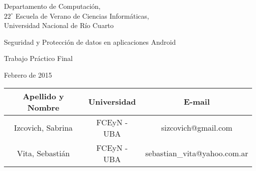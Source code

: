 \documentclass[10pt, a4paper]{article}
\author{Seguridad Android.}
\date{}								%
\begin{document}
\thispagestyle{empty}

\begin{center}

\vspace{2cm}

Departamento de Computación,\\
$22^{\circ}$ Escuela de Verano de Ciencias Informáticas,\\
Universidad Nacional de Río Cuarto

\vspace{4cm}

\begin{Huge}
Seguridad y Protección de datos en aplicaciones Android\end{Huge}

\vspace{0.5cm}

\begin{huge}
Trabajo Práctico Final
\end{huge}

\vspace{1cm}

Febrero de 2015

\vspace{8cm}


\vspace{1cm}

\begin{tabular}{|c|c|c|}
\hline
Apellido y Nombre & Universidad & E-mail\\
\hline
Izcovich, Sabrina     & FCEyN - UBA & sizcovich@gmail.com\\
Vita, Sebastián       & FCEyN - UBA & sebastian\_vita@yahoo.com.ar\\
\hline
\end{tabular}

\end{center}

\newpage
\tableofcontents
\newpage
\end{document}
